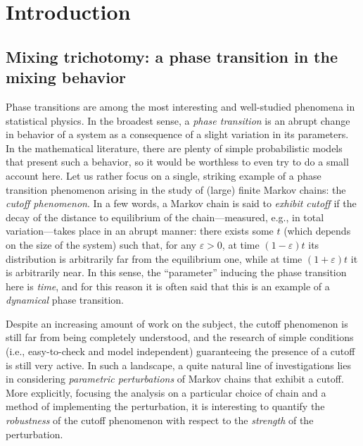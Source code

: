 \documentclass[11pt,oneside]{amsart}
\numberwithin{equation}{section}  %
\theoremstyle{plain}
\begin{document}
\maketitle

\section{Introduction}\label{sec:intro}

\subsection{Mixing trichotomy: a phase transition in the mixing behavior}
Phase transitions are among the most interesting and well-studied phenomena in statistical physics. In the broadest sense, a \emph{phase transition} is an abrupt change in behavior of a system as a consequence of a slight variation in its parameters. In the mathematical literature, there are plenty of simple probabilistic models that present such a behavior, so it would be worthless to even try to do a small account here. Let us rather focus on a single, striking example of a phase transition phenomenon arising in the study of (large) finite Markov chains: the \emph{cutoff phenomenon}. In a few words, a Markov chain is said to \emph{exhibit cutoff} if the decay of the distance to equilibrium of the chain---measured, e.g., in total variation---takes place in an abrupt manner: there exists some $t$ (which depends on the size of the system) such that, for any $\varepsilon>0$, at time $(1-\varepsilon)t$ its distribution is arbitrarily far from the equilibrium one, while at time $(1+\varepsilon)t$ it is arbitrarily near. In this sense, the ``parameter'' inducing the phase transition here is \emph{time}, and for this reason it is often said that this is an example of a \emph{dynamical} phase transition. 

Despite an increasing amount of work on the subject, the cutoff phenomenon is still far from being completely understood, and the research of simple conditions (i.e., easy-to-check and model independent) guaranteeing the presence of a cutoff is still very active.
In such a landscape, a quite natural line of investigations lies in considering \emph{parametric perturbations} of Markov chains that exhibit a cutoff. More explicitly, focusing the analysis on a particular choice of chain and a method of implementing the perturbation, it is interesting to quantify the \emph{robustness} of the cutoff phenomenon with respect to the \emph{strength} of the perturbation. 
%
\end{document}
